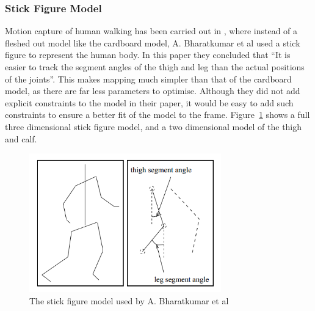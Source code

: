 \subsubsection{Stick Figure Model}

Motion capture of human walking has been carried out in \cite{stickfigure}, where instead of a fleshed out model like the cardboard model, A. Bharatkumar et al used a stick figure to represent the human body. In this paper they concluded that ``It is easier to track the segment angles of the thigh and leg than the actual positions of the joints''. This makes mapping much simpler than that of the cardboard model, as there are far less parameters to optimise. Although they did not add explicit constraints to the model in their paper, it would be easy to add such constraints to ensure a better fit of the model to the frame. Figure~\ref{fig:stickfiguremodel} shows a full three dimensional stick figure model, and a two dimensional model of the thigh and calf.

\begin{figure}[H]
    \centering
    \includegraphics[height=6cm]{background/images/stickfigure}

	\caption{The stick figure model used by A. Bharatkumar et al\cite{stickfigure}}
	\label{fig:stickfiguremodel}
\end{figure}